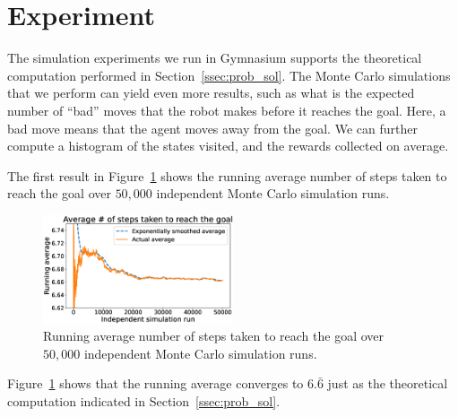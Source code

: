 \section{Experiment}
\label{sec:experiment}
%
The simulation experiments we run in Gymnasium supports the theoretical
computation performed in Section~\ref{ssec:prob_sol}. The Monte Carlo
simulations that we perform can yield even more results, such as what is the 
expected number of ``bad'' moves that the robot makes before it reaches the goal. Here, a bad move means that the agent moves away from the goal. We can 
further compute a histogram of the states visited, and the rewards collected on 
average.

The first result in Figure~\ref{fig:running_avg} shows the running average
number of steps taken to reach the goal over $50,000$ independent Monte Carlo
simulation runs.
%
\begin{figure}[tb]
    \centering
    \includegraphics[width=0.5\textwidth]{./figures/running_avg.eps}
    \caption{Running average number of steps taken to reach the goal over $50,000$ independent Monte Carlo simulation runs.}
    \label{fig:running_avg}
\end{figure}
%
Figure~\ref{fig:running_avg} shows that the running average converges to $6.\bar{6}$ just as the theoretical computation indicated in Section~\ref{ssec:prob_sol}.

